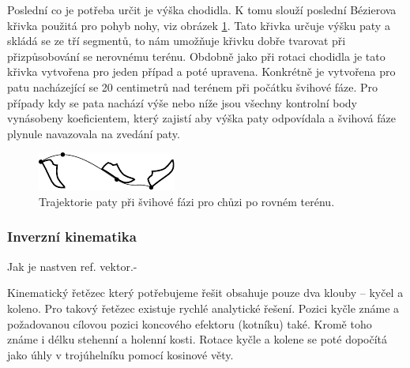 Poslední co je potřeba určit je výška chodidla. K tomu slouží poslední Bézierova křivka použitá pro pohyb nohy, viz obrázek \ref{fig:swingHeight}. Tato křivka určuje výšku paty a skládá se ze tří segmentů, to nám umožňuje křivku dobře tvarovat při přizpůsobování se nerovnému terénu. Obdobně jako při rotaci chodidla je tato křivka vytvořena pro jeden případ a poté upravena. Konkrétně je vytvořena pro patu nacházející se 20 centimetrů nad terénem při počátku švihové fáze. Pro případy kdy se pata nachází výše nebo níže jsou všechny kontrolní body vynásobeny koeficientem, který zajistí aby výška paty odpovídala a švihová fáze plynule navazovala na zvedání paty.

\begin{figure}[h]
	\centering
	\includegraphics[width=0.5\linewidth]{fig/legSwingCurve_excel.pdf}
	\caption{Trajektorie paty při švihové fázi pro chůzi po rovném terénu.}
	\label{fig:swingHeight}
\end{figure}

\subsubsection{Inverzní kinematika}
Jak je nastven ref. vektor.-

Kinematický řetězec který potřebujeme řešit obsahuje pouze dva klouby -- kyčel a koleno. Pro takový řetězec existuje rychlé analytické řešení. Pozici kyčle známe a požadovanou cílovou pozici koncového efektoru (kotníku) také. Kromě toho známe i délku stehenní a holenní kosti. Rotace kyčle a kolene se poté dopočítá jako úhly v trojúhelníku pomocí kosinové věty.

